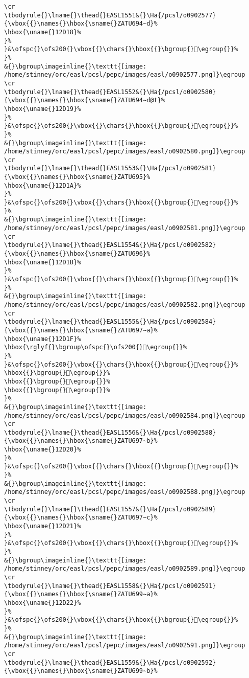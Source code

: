 \begin{verbatim}
\cr
\tbodyrule{}\lname{}\thead{}EASL1551&{}\Ha{/pcsl/o0902577}{\vbox{{}\names{}\hbox{\sname{}ZATU694∼d}%
\hbox{\uname{}12D18}%
}%
}&\ofspc{}\ofs200{}\vbox{{}\chars{}\hbox{{}\bgroup{}𒴘\egroup{}}%
}%
&{}\bgroup\imageinline{}\texttt{[image: /home/stinney/orc/easl/pcsl/pepc/images/easl/o0902577.png]}\egroup
\cr
\tbodyrule{}\lname{}\thead{}EASL1552&{}\Ha{/pcsl/o0902580}{\vbox{{}\names{}\hbox{\sname{}ZATU694∼d@t}%
\hbox{\uname{}12D19}%
}%
}&\ofspc{}\ofs200{}\vbox{{}\chars{}\hbox{{}\bgroup{}𒴙\egroup{}}%
}%
&{}\bgroup\imageinline{}\texttt{[image: /home/stinney/orc/easl/pcsl/pepc/images/easl/o0902580.png]}\egroup
\cr
\tbodyrule{}\lname{}\thead{}EASL1553&{}\Ha{/pcsl/o0902581}{\vbox{{}\names{}\hbox{\sname{}ZATU695}%
\hbox{\uname{}12D1A}%
}%
}&\ofspc{}\ofs200{}\vbox{{}\chars{}\hbox{{}\bgroup{}𒴚\egroup{}}%
}%
&{}\bgroup\imageinline{}\texttt{[image: /home/stinney/orc/easl/pcsl/pepc/images/easl/o0902581.png]}\egroup
\cr
\tbodyrule{}\lname{}\thead{}EASL1554&{}\Ha{/pcsl/o0902582}{\vbox{{}\names{}\hbox{\sname{}ZATU696}%
\hbox{\uname{}12D1B}%
}%
}&\ofspc{}\ofs200{}\vbox{{}\chars{}\hbox{{}\bgroup{}𒴛\egroup{}}%
}%
&{}\bgroup\imageinline{}\texttt{[image: /home/stinney/orc/easl/pcsl/pepc/images/easl/o0902582.png]}\egroup
\cr
\tbodyrule{}\lname{}\thead{}EASL1555&{}\Ha{/pcsl/o0902584}{\vbox{{}\names{}\hbox{\sname{}ZATU697∼a}%
\hbox{\uname{}12D1F}%
\hbox{\rglyf{}\bgroup\ofspc{}\ofs200{}𒴟\egroup{}}%
}%
}&\ofspc{}\ofs200{}\vbox{{}\chars{}\hbox{{}\bgroup{}𒴜\egroup{}}%
\hbox{{}\bgroup{}𒴝\egroup{}}%
\hbox{{}\bgroup{}𒴞\egroup{}}%
\hbox{{}\bgroup{}𒴟\egroup{}}%
}%
&{}\bgroup\imageinline{}\texttt{[image: /home/stinney/orc/easl/pcsl/pepc/images/easl/o0902584.png]}\egroup
\cr
\tbodyrule{}\lname{}\thead{}EASL1556&{}\Ha{/pcsl/o0902588}{\vbox{{}\names{}\hbox{\sname{}ZATU697∼b}%
\hbox{\uname{}12D20}%
}%
}&\ofspc{}\ofs200{}\vbox{{}\chars{}\hbox{{}\bgroup{}𒴠\egroup{}}%
}%
&{}\bgroup\imageinline{}\texttt{[image: /home/stinney/orc/easl/pcsl/pepc/images/easl/o0902588.png]}\egroup
\cr
\tbodyrule{}\lname{}\thead{}EASL1557&{}\Ha{/pcsl/o0902589}{\vbox{{}\names{}\hbox{\sname{}ZATU697∼c}%
\hbox{\uname{}12D21}%
}%
}&\ofspc{}\ofs200{}\vbox{{}\chars{}\hbox{{}\bgroup{}𒴡\egroup{}}%
}%
&{}\bgroup\imageinline{}\texttt{[image: /home/stinney/orc/easl/pcsl/pepc/images/easl/o0902589.png]}\egroup
\cr
\tbodyrule{}\lname{}\thead{}EASL1558&{}\Ha{/pcsl/o0902591}{\vbox{{}\names{}\hbox{\sname{}ZATU699∼a}%
\hbox{\uname{}12D22}%
}%
}&\ofspc{}\ofs200{}\vbox{{}\chars{}\hbox{{}\bgroup{}𒴢\egroup{}}%
}%
&{}\bgroup\imageinline{}\texttt{[image: /home/stinney/orc/easl/pcsl/pepc/images/easl/o0902591.png]}\egroup
\cr
\tbodyrule{}\lname{}\thead{}EASL1559&{}\Ha{/pcsl/o0902592}{\vbox{{}\names{}\hbox{\sname{}ZATU699∼b}%

\end{verbatim}
